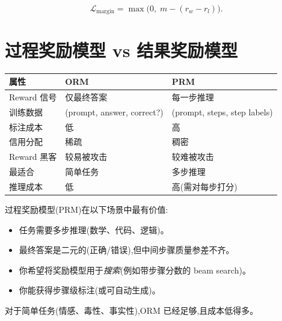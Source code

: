 \[
\mathcal{L}_{\text{margin}} = \max\!\bigl(0,\; m - (r_w - r_l)\bigr).
\]

\section{过程奖励模型 vs 结果奖励模型}
\label{sec:prm-orm}

\begin{keybox}
\begin{center}
\begin{tabular}{@{}l l l@{}}
\toprule
\textbf{属性} & \textbf{ORM} & \textbf{PRM} \\
\midrule
Reward 信号 & 仅最终答案 & 每一步推理 \\
训练数据 & (prompt, answer, correct?) & (prompt, steps, step labels) \\
标注成本 & 低 & 高 \\
信用分配 & 稀疏 & 稠密 \\
Reward 黑客 & 较易被攻击 & 较难被攻击 \\
最适合 & 简单任务 & 多步推理 \\
推理成本 & 低 & 高(需对每步打分) \\
\bottomrule
\end{tabular}
\end{center}
\end{keybox}

\begin{intuitionbox}
过程奖励模型(PRM)在以下场景中最有价值:

\begin{itemize}
  \item 任务需要多步推理(数学、代码、逻辑)。
  \item 最终答案是二元的(正确/错误),但中间步骤质量参差不齐。
  \item 你希望将奖励模型用于\emph{搜索}(例如带步骤分数的 beam search)。
  \item 你能获得步骤级标注(或可自动生成)。
\end{itemize}

对于简单任务(情感、毒性、事实性),ORM 已经足够,且成本低得多。
\end{intuitionbox}

